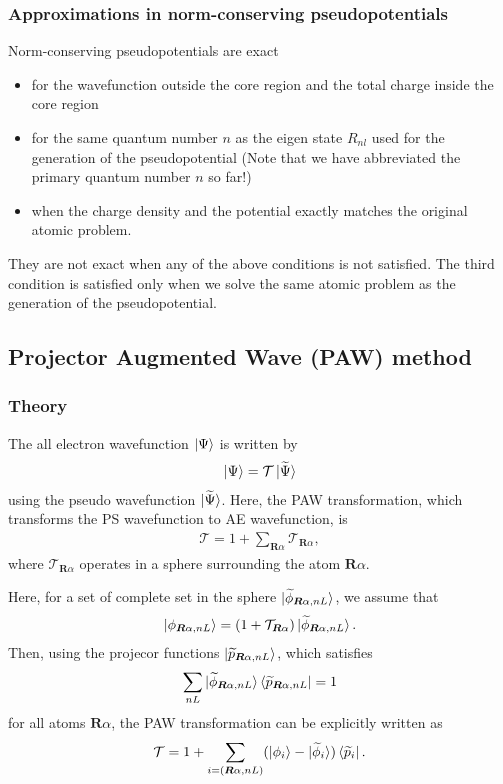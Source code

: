 \documentclass{article}
\begin{document}
\subsubsection{Approximations in norm-conserving pseudopotentials}
Norm-conserving pseudopotentials are exact
\begin{itemize} 
  \item for the wavefunction outside the core region and the total charge inside the core region
  \item for the same quantum number $n$ as the eigen state $R_{nl}$ used for the generation of the pseudopotential (Note that we have abbreviated the primary quantum number $n$ so far!)
  \item when the charge density and the potential exactly matches the original atomic problem.
\end{itemize}
They are not exact when any of the above conditions is not satisfied. The third condition is satisfied only when we solve the same atomic problem as the generation of the pseudopotential.


\subsection{Projector Augmented Wave (PAW) method}
\subsubsection{Theory}
The all electron wavefunction $\ket{\Psi}$ is written by 
\begin{align}
\ket{\Psi} = \mathcal{T} \ket{\widetilde{\Psi}}
\end{align}
using the pseudo wavefunction $\ket{\widetilde{\Psi}}$. Here, the PAW transformation, which transforms the PS wavefunction to AE wavefunction, is 
\begin{align}
  \mathcal{T} = 1 + \sum_{\bm{R}\alpha} \mathcal{T}_{\bm{R}\alpha},
\end{align}
where $\mathcal{T}_{\bm{R}\alpha}$ operates in a sphere surrounding the atom $\bm{R}\alpha$.

Here, for a set of complete set in the sphere $\ket{\widetilde{\phi}_{\bm{R}\alpha, nL}}$, we assume that 
\begin{align}
  \ket{{\phi}_{\bm{R}\alpha, nL}} = (1 + \mathcal{T}_{\bm{R}\alpha}) \ket{\widetilde{\phi}_{\bm{R}\alpha, nL}}.
\end{align}
Then, using the projecor functions $\ket{\widetilde{p}_{\bm{R}\alpha,nL}}$, which satisfies
\begin{align} 
  \sum_{nL} \ket{\widetilde{\phi}_{\bm{R}\alpha, nL}} \bra{\widetilde{p}_{\bm{R}\alpha, nL}} = 1
\end{align}
for all atoms $\bm{R}\alpha$, the PAW transformation can be explicitly written as 
\begin{align}
  \mathcal{T} = 1 + \sum_{i = (\bm{R}\alpha, nL)} (\ket{\phi_i} - \ket{\widetilde{\phi}_i}) \bra{\widetilde{p}_i}.
\end{align}
\end{document}

